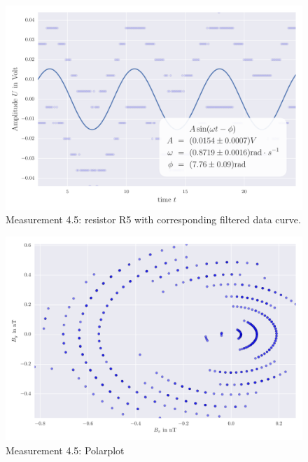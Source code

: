 \begin{figure}[H]
    \centering
    \includegraphics[width=0.7\linewidth]{analysis/figures/fit4_5}
    \caption{Measurement 4.5: resistor R5 with corresponding filtered data curve.}
    \label{fig:4_5_plot}
\end{figure}
\begin{figure}[H]
    \centering
    \includegraphics[width=0.7\linewidth]{analysis/figures/polar4_5}
    \caption{Measurement 4.5: Polarplot}
    \label{fig:4_5_polar}
\end{figure}

